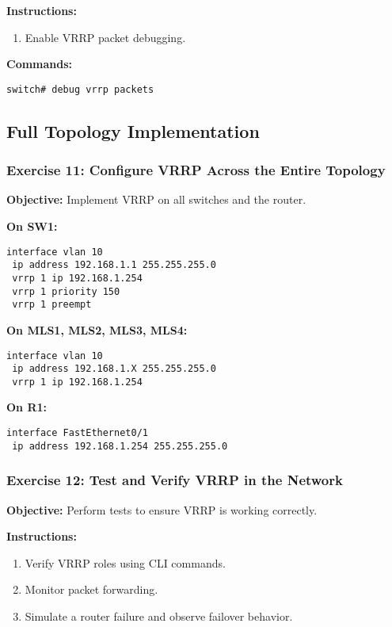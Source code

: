 \documentclass[12pt]{article}
\begin{document}
\textbf{Instructions:}
\begin{enumerate}
\item Enable VRRP packet debugging.
\end{enumerate}

\textbf{Commands:}
\begin{lstlisting}[style=CiscoCLI]
switch# debug vrrp packets
\end{lstlisting}

\bigskip

\subsection{Full Topology Implementation}

\subsubsection*{Exercise 11: Configure VRRP Across the Entire Topology}
\textbf{Objective:} Implement VRRP on all switches and the router.

\textbf{On SW1:}
\begin{lstlisting}[style=CiscoCLI]
interface vlan 10
 ip address 192.168.1.1 255.255.255.0
 vrrp 1 ip 192.168.1.254
 vrrp 1 priority 150
 vrrp 1 preempt
\end{lstlisting}

\textbf{On MLS1, MLS2, MLS3, MLS4:}
\begin{lstlisting}[style=CiscoCLI]
interface vlan 10
 ip address 192.168.1.X 255.255.255.0
 vrrp 1 ip 192.168.1.254
\end{lstlisting}

\textbf{On R1:}
\begin{lstlisting}[style=CiscoCLI]
interface FastEthernet0/1
 ip address 192.168.1.254 255.255.255.0
\end{lstlisting}

\bigskip

\subsubsection*{Exercise 12: Test and Verify VRRP in the Network}
\textbf{Objective:} Perform tests to ensure VRRP is working correctly.

\textbf{Instructions:}
\begin{enumerate}
\item Verify VRRP roles using CLI commands.
\item Monitor packet forwarding.
\item Simulate a router failure and observe failover behavior.
\end{enumerate}
\end{document}
